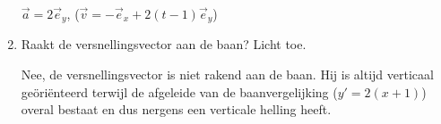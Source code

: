 \begin{enumerate}
\begin{oplossing}
	$\vec{a}=2\vec{e}_y$, ($\vec{v}=-\vec{e}_x+2(t-1)\vec{e}_y$)
\end{oplossing}

\item Raakt de versnellingsvector aan de baan? Licht toe.

\begin{oplossing}
	Nee, de versnellingsvector is niet rakend aan de baan. Hij is altijd verticaal ge\"ori\"enteerd terwijl de afgeleide van de baanvergelijking ($y'=2(x+1)$) overal bestaat en dus nergens een verticale helling heeft.
\end{oplossing}

\end{enumerate}